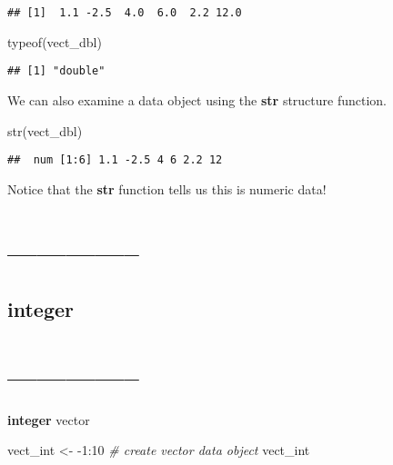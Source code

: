 \documentclass[
]{article}
\newenvironment{Shaded}{\begin{snugshade}}{\end{snugshade}}
\newcommand{\CommentTok}[1]{\textcolor[rgb]{0.56,0.35,0.01}{\textit{#1}}}
\newcommand{\DecValTok}[1]{\textcolor[rgb]{0.00,0.00,0.81}{#1}}
\newcommand{\FunctionTok}[1]{\textcolor[rgb]{0.00,0.00,0.00}{#1}}
\newcommand{\NormalTok}[1]{#1}
\newcommand{\OtherTok}[1]{\textcolor[rgb]{0.56,0.35,0.01}{#1}}
\newcommand{\SpecialCharTok}[1]{\textcolor[rgb]{0.00,0.00,0.00}{#1}}
\begin{document}
\begin{verbatim}
## [1]  1.1 -2.5  4.0  6.0  2.2 12.0
\end{verbatim}

\begin{Shaded}
\begin{Highlighting}[]
\FunctionTok{typeof}\NormalTok{(vect\_dbl)}
\end{Highlighting}
\end{Shaded}

\begin{verbatim}
## [1] "double"
\end{verbatim}

We can also examine a data object using the \textbf{str} structure
function.

\begin{Shaded}
\begin{Highlighting}[]
\FunctionTok{str}\NormalTok{(vect\_dbl)}
\end{Highlighting}
\end{Shaded}

\begin{verbatim}
##  num [1:6] 1.1 -2.5 4 6 2.2 12
\end{verbatim}

Notice that the \textbf{str} function tells us this is numeric data!

\hypertarget{section-10}{%
\section{--------------}\label{section-10}}

\hypertarget{integer}{%
\subsection{integer}\label{integer}}

\hypertarget{section-11}{%
\section{--------------}\label{section-11}}

\textbf{integer} vector

\begin{Shaded}
\begin{Highlighting}[]
\NormalTok{vect\_int }\OtherTok{\textless{}{-}} \SpecialCharTok{{-}}\DecValTok{1}\SpecialCharTok{:}\DecValTok{10} \CommentTok{\# create vector data object}
\NormalTok{vect\_int}
\end{Highlighting}
\end{Shaded}
\end{document}
